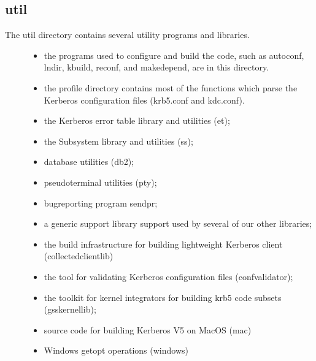\documentclass[letterpaper,10pt,english]{sphinxmanual}
\begin{document}
\subsection{util}
\label{\detokenize{build/directory_org:util}}\label{\detokenize{build/directory_org:id2}}\begin{description}
\item[{The util directory contains several utility programs and libraries.}] \leavevmode\begin{itemize}
\item {} 
\sphinxAtStartPar
the programs used to configure and build the code, such as
autoconf, lndir, kbuild, reconf, and makedepend, are in this
directory.

\item {} 
\sphinxAtStartPar
the profile directory contains most of the functions which parse
the Kerberos configuration files (krb5.conf and kdc.conf).

\item {} 
\sphinxAtStartPar
the Kerberos error table library and utilities (et);

\item {} 
\sphinxAtStartPar
the Sub\sphinxhyphen{}system library and utilities (ss);

\item {} 
\sphinxAtStartPar
database utilities (db2);

\item {} 
\sphinxAtStartPar
pseudo\sphinxhyphen{}terminal utilities (pty);

\item {} 
\sphinxAtStartPar
bug\sphinxhyphen{}reporting program send\sphinxhyphen{}pr;

\item {} 
\sphinxAtStartPar
a generic support library support used by several of our other
libraries;

\item {} 
\sphinxAtStartPar
the build infrastructure for building lightweight Kerberos client
(collected\sphinxhyphen{}client\sphinxhyphen{}lib)

\item {} 
\sphinxAtStartPar
the tool for validating Kerberos configuration files
(confvalidator);

\item {} 
\sphinxAtStartPar
the toolkit for kernel integrators for building krb5 code subsets
(gss\sphinxhyphen{}kernel\sphinxhyphen{}lib);

\item {} 
\sphinxAtStartPar
source code for building Kerberos V5 on MacOS (mac)

\item {} 
\sphinxAtStartPar
Windows getopt operations (windows)

\end{itemize}

\end{description}
\end{document}
